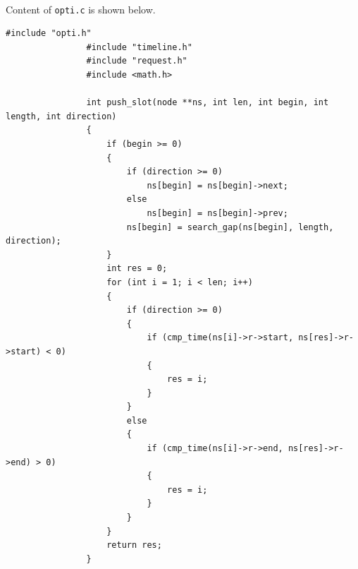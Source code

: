 \documentclass{article}
\begin{document}
            \paragraph{}
                Content of \texttt{opti.c} is shown below.
            \begin{Verbatim}[gobble=8]
                #include "opti.h"
                #include "timeline.h"
                #include "request.h"
                #include <math.h>
                
                int push_slot(node **ns, int len, int begin, int length, int direction)
                {
                    if (begin >= 0)
                    {
                        if (direction >= 0)
                            ns[begin] = ns[begin]->next;
                        else
                            ns[begin] = ns[begin]->prev;
                        ns[begin] = search_gap(ns[begin], length, direction);
                    }
                    int res = 0;
                    for (int i = 1; i < len; i++)
                    {
                        if (direction >= 0)
                        {
                            if (cmp_time(ns[i]->r->start, ns[res]->r->start) < 0)
                            {
                                res = i;
                            }
                        }
                        else
                        {
                            if (cmp_time(ns[i]->r->end, ns[res]->r->end) > 0)
                            {
                                res = i;
                            }
                        }
                    }
                    return res;
                }
                

\end{Verbatim}
\end{document}
